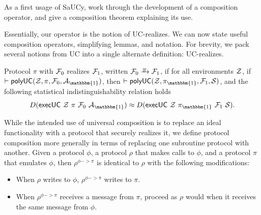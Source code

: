 As a first usage of SaUCy, work through the development of a composition
operator, and give a composition theorem explaining its use.


Essentially, our operator is the notion of UC-realizes. We can now state useful
composition operators, simplifying lemmas, and notation. For brevity, we pack
several notions from UC into a single alternate definition: UC-realizes.

\begin{definition}[UC-realizes]
  Protocol $\pi$ with $\mathcal{{F}}_0$ realizes $\mathcal{{F}}_1$, written $\mc{F}_0
  \yrightarrow{$\pi$} \mc{F}_1$, if for all environments $\mathcal{{Z}}$, if $|-
  \keyword{polyUC}(\mc{Z}, \pi, \mc{F}_0, \mc{A}_{\mathbbm{1}})$, then
  $|- \keyword{polyUC}(\mc{Z}, \pi_{\mathbbm{1}}, \mc{F}_1, \mc{S})$, and the
  following statistical indistinguishability relation holds
  \[ D(\mathsf{execUC}\ \mc{Z}\ \pi\ \mc{F}_0\ \mc{A}_{\mathbbm{1}}) \approx D(\mathsf{execUC}\ \mc{Z}\ \pi_{\mathbbm{1}}\ \mc{F}_1\ \mc{S}).\]
\end{definition}

  While the intended use of universal composition is to replace an
ideal functionality with a protocol that securely realizes it, we define
protocol composition  more generally in terms of
replacing one subroutine protocol with another. Given a protocol $\phi$, a protocol
$\rho$ that makes calls to $\phi$,  and a protocol $\pi$ that emulates $\phi$, then $\rho^{\phi -> \pi}$ is identical to
$\rho$ with the following modifications:
\begin{itemize}[leftmargin=*]
  \item When $\rho$ writes to $\phi$, $\rho^{\phi -> \pi}$ writes to $\pi$.
  \item When $\rho^{\phi -> \pi}$ receives a message from $\pi$, proceed as $\rho$ would when
    it receives the same message from $\phi$.
\end{itemize}

